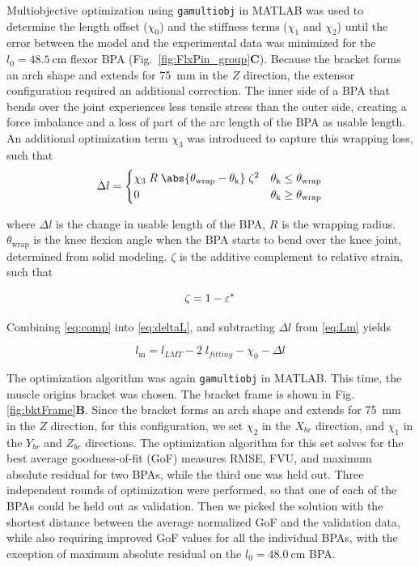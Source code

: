 Multiobjective optimization using \texttt{gamultiobj} in MATLAB was used to determine the length offset ($\chi_{0}$) and the stiffness terms ($\chi_{1}$ and $\chi_{2}$) until the error between the model and the experimental data was minimized for the $l_{0}=\qty{48.5}{\cm}$ flexor BPA (Fig.~\ref{fig:FlxPin_group}\textbf{C}). Because the bracket forms an arch shape and extends for \qty{75}{\mm} in the $Z$ direction, the extensor configuration required an additional correction. The inner side of a BPA that bends over the joint experiences less tensile stress than the outer side, creating a force imbalance and a loss of part of the arc length of the BPA as usable length. An additional optimization term $\chi_{3}$ was introduced to capture this wrapping loss, such that
\begin{equation}
    \Delta l = \begin{cases}
     \chi_{3}\;R\;\abs{ \theta_\text{wrap}-\theta_\text{k}}\;\zeta^2 & \theta_\text{k} \leq      \theta_\text{wrap} \\
      0 & \theta_\text{k} \geq \theta_\text{wrap}
     \end{cases}\label{eq:deltaL}
\end{equation}

where $\Delta l$ is the change in usable length of the BPA, $R$ is the wrapping radius. $\theta_\text{wrap}$ is the knee flexion angle when the BPA starts to bend over the knee joint, determined from solid modeling. $\zeta$ is the additive complement to relative strain, such that

\begin{equation}
    \zeta = 1-\varepsilon^*  \\
\label{eq:comp}
\end{equation}

Combining \eqref{eq:comp} into \eqref{eq:deltaL}, and subtracting $\Delta l$ from  \eqref{eq:Lm} yields

\begin{equation}
    l_\text{m} = l_{LMT} - 2\;l_{fitting}  - \chi_{0} - \Delta l\label{eq:x3}
\end{equation}

The optimization algorithm was again \texttt{gamultiobj} in MATLAB. This time, the muscle origins bracket was chosen. The bracket frame is shown in Fig. \ref{fig:bktFrame}\textbf{B}. Since the bracket forms an arch shape and extends for \qty{75}{\mm} in the $Z$ direction, for this configuration, we set $\chi_{2}$ in the $X_{br}$ direction, and $\chi_{1}$ in the $Y_{br}$ and $Z_{br}$ directions. The optimization algorithm for this set solves for the best average goodness-of-fit (GoF) measures RMSE, FVU, and maximum absolute residual for two BPAs, while the third one was held out. Three independent rounds of optimization were performed, so that one of each of the BPAs could be held out as validation. Then we picked the solution with the shortest distance between the average normalized GoF and the validation data, while also requiring improved GoF values for all the individual BPAs, with the exception of maximum absolute residual on the $l_{0}=\qty{48.0}{\cm}$ BPA.

